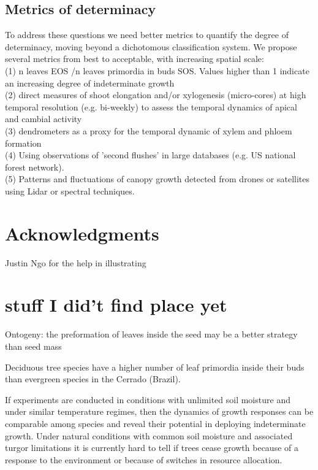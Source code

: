 \documentclass{article}
\begin{document}
	\subsection*{Metrics of determinacy}
	To address these questions we need better metrics to quantify the degree of determinacy, moving beyond a dichotomous classification system. We propose several metrics from best to acceptable, with increasing spatial scale: \\
	
	(1) n leaves  EOS /n leaves primordia in buds SOS. Values higher than 1 indicate an increasing degree of indeterminate growth \\
	
	(2) direct measures of shoot elongation and/or xylogenesis (micro-cores) at high temporal resolution (e.g. bi-weekly) to assess the temporal dynamics of apical and cambial activity\\
	
	(3) dendrometers as a proxy for the temporal dynamic of xylem and phloem formation \\
	
	(4) Using observations of 'second flushes' in large databases (e.g. US national forest network). \\
	
	(5) Patterns and fluctuations of canopy growth detected from drones or satellites using Lidar or spectral techniques.
	

	

	
\section*{Acknowledgments}
	Justin Ngo for the help in illustrating
	

	
	

	
	\pagebreak
	

	\newpage
\section*{stuff I did't find place yet}
Ontogeny: 
the preformation of leaves inside the seed may be a better strategy than seed mass \citep{silvaCouldPresencePreformed2023}


Deciduous tree species have a higher number of leaf primordia inside their buds than evergreen species in the Cerrado (Brazil). 
	
If experiments are conducted in conditions with unlimited soil moisture and under similar temperature regimes, then the dynamics of growth responses can be comparable among species and reveal their potential in deploying indeterminate growth. Under natural conditions with common soil moisture and associated turgor limitations it is currently hard to tell if trees cease growth because of a response to the environment or because of switches in resource allocation. 
\end{document}
